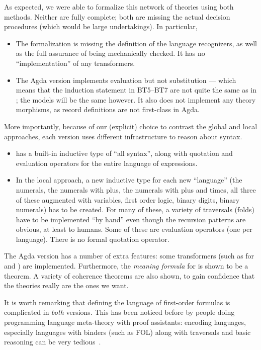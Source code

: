 \documentclass[fleqn]{llncs}
\begin{document}
As expected, we were able to formalize this network of theories using
both methods.  Neither are fully complete; both are missing the actual
decision procedures (which would be large undertakings).  In particular,
\begin{itemize}
\item The {\churchuqe} formalization is missing the definition of the language
recognizers, as well as the full assurance of being mechanically checked.
It has no ``implementation'' of any transformers.
\item The Agda version implements evaluation but not substitution --- which means
that the induction statement in BT5--BT7 are not quite the same as in
{\churchuqe}; the models will be the same however.  It also does not implement
any theory morphisms, as record definitions are not first-class in Agda. 
\end{itemize}

More importantly, because of our (explicit) choice to contrast the
global and local approaches, each version uses different infrastructure to
reason about syntax.
\begin{itemize}
\item {\churchuqe} has a built-in inductive type of ``all syntax'',
along with quotation and evaluation operators for the entire language
of expressions.
\item In the local approach, a new inductive type for each new
``language'' (the numerals, the numerals with plus, the numerals with
plus and times, all three of these augmented with variables, first order
logic, binary digits, binary numerals) has to be created.  For many of 
these, a variety of traversals (folds) have to be implemented ``by hand''
even though the recursion patterns are obvious, at least to humans.
Some of these are evaluation operators (one per language).  There is no
formal quotation operator.
\end{itemize}

The Agda version has a number of extra features: some transformers (such as
for  and ) are implemented.
Furthermore, the \emph{meaning formula} for  is
shown to be a theorem.  A variety of coherence theorems are also shown,
to gain confidence that the theories really are the ones we want.

It is worth remarking that defining the language of first-order formulas
is complicated in \emph{both} versions.  This has been noticed before by
people doing programming language meta-theory with proof assistants: 
encoding languages, especially languages with binders (such as FOL) along
with traversals and basic reasoning can be very tedious~\cite{poplmark}.
\end{document}
